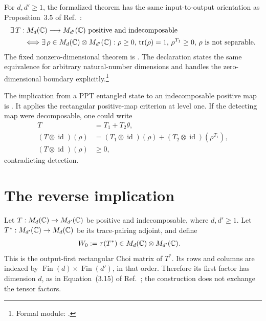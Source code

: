 \documentclass{article}
\begin{document}
For $d,d'\geq1$, the formalized theorem has the same input-to-output
orientation as Proposition~3.5 of Ref.~\cite{Wolf2012Quantum}:
\begin{align}
    &\exists\,T:M_{d}(\mathbb{C})\longrightarrow M_{d'}(\mathbb{C})
      \text{ positive and indecomposable}\nonumber\\
    &\qquad\Longleftrightarrow
      \exists\,\rho\in M_{d}(\mathbb{C})\otimes M_{d'}(\mathbb{C}):
      \rho\geq0,\,
      \operatorname{tr}(\rho)=1,\,
      \rho^{T_1}\geq0,\,
      \rho\text{ is not separable}.
    \label{eq:wolf_prop3_5_reverse_implication_formal_equivalence}
\end{align}
The fixed nonzero-dimensional theorem is
.
The declaration
states the same equivalence for arbitrary natural-number dimensions and
handles the zero-dimensional boundary explicitly.\footnote{Formal module:
.}

The implication from a PPT entangled state to an indecomposable positive map
is
.
It applies the rectangular positive-map criterion at level one. If the
detecting map were decomposable, one could write
\begin{align}
    T
        &=T_1+T_2\theta,
    \label{eq:wolf_prop3_5_reverse_implication_decomposable_map}\\
    (T\otimes\operatorname{id})(\rho)
        &=(T_1\otimes\operatorname{id})(\rho)
          +(T_2\otimes\operatorname{id})(\rho^{T_1}),
    \label{eq:wolf_prop3_5_reverse_implication_decomposable_detection}\\
    (T\otimes\operatorname{id})(\rho)
        &\geq0,
    \label{eq:wolf_prop3_5_reverse_implication_decomposable_nonnegative}
\end{align}
contradicting detection.

\section{The reverse implication}

Let $T:M_{d}(\mathbb{C})\to M_{d'}(\mathbb{C})$ be positive and indecomposable, where $d,d'\geq1$.
Let $T^*:M_{d'}(\mathbb{C})\to M_{d}(\mathbb{C})$ be its trace-pairing adjoint, and define
\begin{align}
    W_0
        &:=\tau(T^*)
          \in M_{d}(\mathbb{C})\otimes M_{d'}(\mathbb{C}).
    \label{eq:wolf_prop3_5_reverse_implication_trace_adjoint_choi_witness}
\end{align}
This is the output-first rectangular Choi matrix of $T^*$. Its rows and
columns are indexed by
$\operatorname{Fin}(d)\times\operatorname{Fin}(d')$, in that order.
Therefore its first factor has dimension $d$, as in Equation~(3.15) of
Ref.~\cite{Wolf2012Quantum}; the construction does not exchange the tensor
factors.
\end{document}
